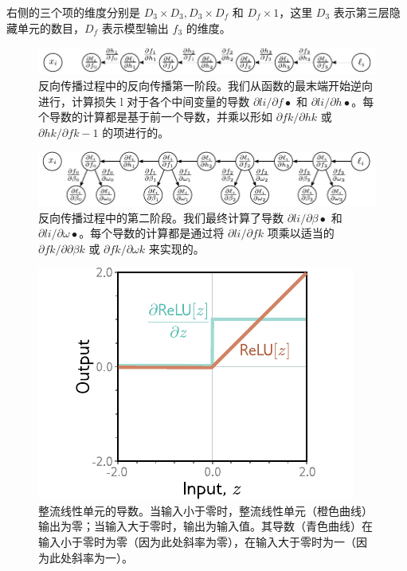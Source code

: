 \documentclass[lang=cn,newtx,10pt,scheme=chinese]{elegantbook}
\begin{document}
右侧的三个项的维度分别是 \(D_3 \times D_3, D_3 \times D_f\) 和 \(D_f \times 1\)，这里 \(D_3\) 表示第三层隐藏单元的数目，\(D_f\) 表示模型输出 \(f_3\) 的维度。

\begin{figure}[ht!]
\centering
\includegraphics[width=0.7\linewidth]{PDFFigures/UDLChap7PDF/Train2BP2.pdf}
\caption{反向传播过程中的反向传播第一阶段。我们从函数的最末端开始逆向进行，计算损失 l 对于各个中间变量的导数 \(\partial li /\partial f•\) 和 \(\partial li /\partial h•\)。每个导数的计算都是基于前一个导数，并乘以形如 \(\partial fk/\partial hk\) 或 \(\partial hk/\partial fk−1\) 的项进行的。}
\end{figure}

\begin{figure}[ht!]
\centering
\includegraphics[width=0.7\linewidth]{PDFFigures/UDLChap7PDF/Train2BP3.pdf}
\caption{反向传播过程中的第二阶段。我们最终计算了导数 \(\partial li /\partial \beta•\) 和 \(\partial li /\partial \omega•\)。每个导数的计算都是通过将 \(\partial li/\partial fk\) 项乘以适当的 \(\partial fk/\partial \partial \beta k\) 或 \(\partial fk/\partial \omega k\) 来实现的。}
\end{figure}

\begin{figure}[ht!]
\centering
\includegraphics[width=0.7\linewidth]{PDFFigures/UDLChap7PDF/Train2ReLUDeriv.pdf}
\caption{整流线性单元的导数。当输入小于零时，整流线性单元（橙色曲线）输出为零；当输入大于零时，输出为输入值。其导数（青色曲线）在输入小于零时为零（因为此处斜率为零），在输入大于零时为一（因为此处斜率为一）。}
\end{figure}
\end{document}
